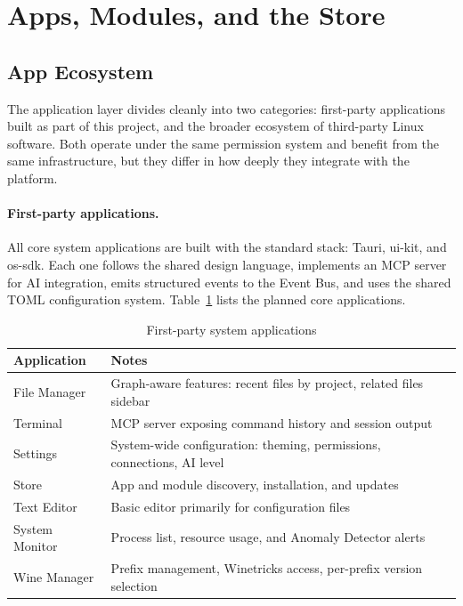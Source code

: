 \section{Apps, Modules, and the Store}
\label{sec:apps-modules}

\subsection{App Ecosystem}
\label{sec:app-ecosystem}

The application layer divides cleanly into two categories: first-party
applications built as part of this project, and the broader ecosystem of
third-party Linux software. Both operate under the same permission system and
benefit from the same infrastructure, but they differ in how deeply they
integrate with the platform.

\paragraph{First-party applications.}
All core system applications are built with the standard stack: Tauri, ui-kit,
and os-sdk. Each one follows the shared design language, implements an MCP
server for AI integration, emits structured events to the Event Bus, and uses
the shared TOML configuration system. Table~\ref{tab:first-party} lists the
planned core applications.

\begin{table}[htbp]
\caption{First-party system applications}
\label{tab:first-party}
\begin{tabularx}{\linewidth}{lX}
\toprule
\textbf{Application} & \textbf{Notes} \\
\midrule
File Manager    & Graph-aware features: recent files by project, related files sidebar \\
Terminal        & MCP server exposing command history and session output \\
Settings        & System-wide configuration: theming, permissions, connections, AI level \\
Store           & App and module discovery, installation, and updates \\
Text Editor     & Basic editor primarily for configuration files \\
System Monitor  & Process list, resource usage, and Anomaly Detector alerts \\
Wine Manager    & Prefix management, Winetricks access, per-prefix version selection \\
\bottomrule
\end{tabularx}
\end{table}

